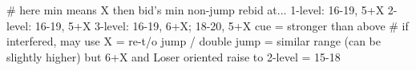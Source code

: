 # here min means X then bid's min
non-jump rebid at... 
    1-level: 16-19, 5+X
    2-level: 16-19, 5+X
    3-level: 16-19, 6+X; 18-20, 5+X
cue = stronger than above  # if interfered, may use X = re-t/o
jump / double jump = similar range (can be slightly higher) but 6+X and Loser oriented
raise to 2-level = 15-18